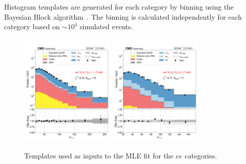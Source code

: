 Histogram templates are generated for each category by binning using the
Bayesian Block algorithm~\cite{Pollack:2017srh}.  The binning is
calculated independently for each category based on $\sim 10^{4}$
simulated events.


\begin{figure}[htb!]
    \centering
    \includegraphics[width=0.4\textwidth]{chapters/Analysis/sectionStatisticalAnalysis/figures/fit/ee_cat_gt2_eq1_b}
    \includegraphics[width=0.4\textwidth]{chapters/Analysis/sectionStatisticalAnalysis/figures/fit/ee_cat_gt2_gt2_b}

    \caption{Templates used as inputs to the MLE fit for the $ee$ categories.}
    \label{fig:fits_templates_ee}
\end{figure}

